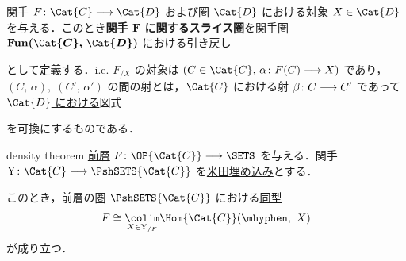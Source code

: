 \documentclass[TQFT_main]{subfiles}
\begin{document}
関手 $F \colon \Cat{C} \lto \Cat{D}$ および\underline{圏 $\Cat{D}$ における}対象 $X \in \Cat{D}$ を与える．このとき\textbf{関手 $\bm{F}$ に関するスライス圏}を関手圏 $\bm{\mathrm{Fun}(\Cat{C},\, \Cat{D})}$ における\hyperref[def:lim]{引き戻し}
\begin{center}
\end{center}
として定義する．i.e. $F_{/X}$ の対象は $(C \in \Cat{C},\, \alpha \colon F(C) \lto X)$ であり，$(C,\, \alpha),\; (C',\, \alpha')$ の間の射とは，$\Cat{C}$ における射 $\beta \colon C \longrightarrow C'$ であって \underline{$\Cat{D}$ における}図式
\begin{center}
\end{center}
を可換にするものである．

\begin{mytheo}[label=thm:density-cat]{density theorem}
    \hyperref[def:presheaf-general]{前層} $F \colon \OP{\Cat{C}} \lto \SETS$ を与える．関手 $\mathrm{Y} \colon \Cat{C} \lto \PshSETS{\Cat{C}}$ を\hyperref[def:representable]{米田埋め込み}とする．
    
    このとき，前層の圏 $\PshSETS{\Cat{C}}$ における\hyperref[def:iso]{同型}
    \begin{align}
        F \cong \underset{X \in \mathrm{Y}_{/F}}{\colim} \Hom{\Cat{C}} (\mhyphen,\ X)
    \end{align}
    が成り立つ．
\end{mytheo}
\end{document}
